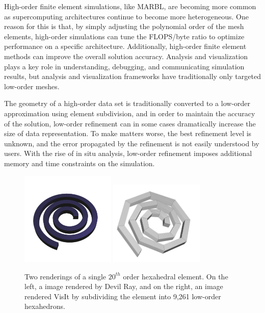 High-order finite element simulations, like MARBL, are becoming more
common as supercomputing architectures continue to become more
heterogeneous.
%
One reason for this is that, by simply adjusting the polynomial order
of the mesh elements, high-order simulations
can tune the FLOPS/byte ratio to optimize performance on a specific architecture.
%
Additionally, high-order finite element methods can improve the overall solution accuracy.
%
Analysis and visualization plays a key role in understanding, debugging,
and communicating simulation results, but analysis and visualization frameworks
have traditionally only targeted low-order meshes.
%

The geometry of a high-order data set is traditionally converted
to a low-order approximation using element subdivision, and in order
to maintain the accuracy of the solution, low-order refinement can
in some cases dramatically increase the size of data representation.
%
To make matters worse, the best refinement level is unknown,
and the error propagated by the refinement is not easily understood by users.
%
With the rise of in situ analysis, low-order refinement imposes additional memory
and time constraints on the simulation.
%

\begin{figure}
\centering
\includegraphics[width=0.4\textwidth]{images/dray_crazy}
\includegraphics[width=0.4\textwidth]{images/visit_crazy}
\caption{\label{img:crazy_hex} Two renderings of a single $20^{th}$ order hexahedral element.
On the left, a image rendered by Devil Ray, and on the right, an image rendered VisIt by subdividing the element into
9,261 low-order hexahedrons.}
\end{figure}

